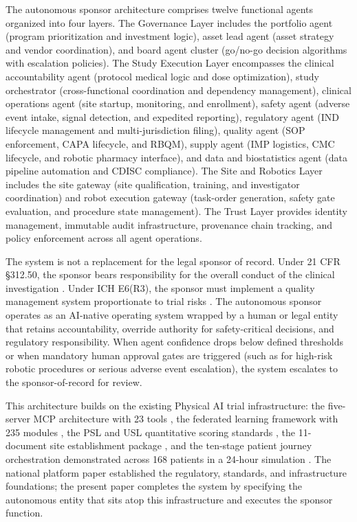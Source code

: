 The autonomous sponsor architecture comprises twelve functional agents organized into four
layers. The Governance Layer includes the portfolio agent (program prioritization and
investment logic), asset lead agent (asset strategy and vendor coordination), and board agent
cluster (go/no-go decision algorithms with escalation policies). The Study Execution Layer
encompasses the clinical accountability agent (protocol medical logic and dose optimization),
study orchestrator (cross-functional coordination and dependency management), clinical
operations agent (site startup, monitoring, and enrollment), safety agent (adverse event
intake, signal detection, and expedited reporting), regulatory agent (IND lifecycle management
and multi-jurisdiction filing), quality agent (SOP enforcement, CAPA lifecycle, and RBQM),
supply agent (IMP logistics, CMC lifecycle, and robotic pharmacy interface), and data and
biostatistics agent (data pipeline automation and CDISC compliance). The Site and Robotics
Layer includes the site gateway (site qualification, training, and investigator coordination)
and robot execution gateway (task-order generation, safety gate evaluation, and procedure
state management). The Trust Layer provides identity management, immutable audit
infrastructure, provenance chain tracking, and policy enforcement across all agent operations.

The system is not a replacement for the legal sponsor of record. Under 21 CFR \S312.50,
the sponsor bears responsibility for the overall conduct of the clinical investigation
\cite{cfr-part-312}. Under ICH E6(R3), the sponsor must implement a quality management system
proportionate to trial risks \cite{ich-e6r3}. The autonomous sponsor operates as an AI-native
operating system wrapped by a human or legal entity that retains accountability, override
authority for safety-critical decisions, and regulatory responsibility. When agent confidence
drops below defined thresholds or when mandatory human approval gates are triggered (such as
for high-risk robotic procedures or serious adverse event escalation), the system escalates to
the sponsor-of-record for review.

This architecture builds on the existing Physical AI trial infrastructure: the five-server MCP
architecture with 23 tools \cite{mcp-repo}, the federated learning framework with 235 modules
\cite{fl-repo}, the PSL and USL quantitative scoring standards \cite{national-platform-paper},
the 11-document site establishment package \cite{site-docs}, and the ten-stage patient journey
orchestration demonstrated across 168 patients in a 24-hour simulation \cite{main-repo}. The
national platform paper established the regulatory, standards, and infrastructure foundations;
the present paper completes the system by specifying the autonomous entity that sits atop this
infrastructure and executes the sponsor function.

